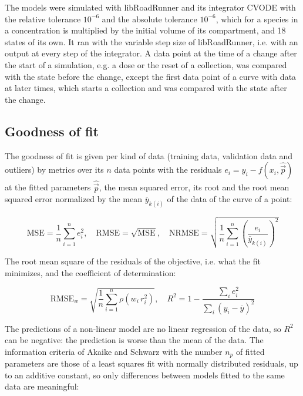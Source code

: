 The models were simulated with libRoadRunner \cite{Welsh2023} and its integrator CVODE \cite{Hindmarsh2005} with the relative tolerance $10^{-6}$ and the absolute tolerance $10^{-6}$, which for a species in a concentration is multiplied by the initial volume of its compartment, and 18 states of its own. It ran with the variable step size of libRoadRunner, i.e. with an output at every step of the integrator. A data point at the time of a change after the start of a simulation, e.g. a dose or the reset of a collection, was compared with the state before the change, except the first data point of a curve with data at later times, which starts a collection and was compared with the state after the change.

\subsection{Goodness of fit}

The goodness of fit is given per kind of data (training data, validation data and outliers) by metrics over its $n$ data points with the residuals $e_i = y_i - f(x_i, \hat{\vec{p}})$ at the fitted parameters $\hat{\vec{p}}$, the mean squared error, its root and the root mean squared error normalized by the mean $\overline{y}_{k(i)}$ of the data of the curve of a point:

\begin{equation}
\mathrm{MSE} = \frac{1}{n} \sum_{i=1}^{n} e_i^2, \quad \mathrm{RMSE} = \sqrt{\mathrm{MSE}}, \quad \mathrm{NRMSE} = \sqrt{\frac{1}{n} \sum_{i=1}^{n} \left(\frac{e_i}{\overline{y}_{k(i)}}\right)^2}
\end{equation}

The root mean square of the residuals of the objective, i.e. what the fit minimizes, and the coefficient of determination:

\begin{equation}
\mathrm{RMSE}_w = \sqrt{\frac{1}{n} \sum_{i=1}^{n} \rho\left(w_i\, r_i^2\right)}, \quad R^2 = 1 - \frac{\sum_{i} e_i^2}{\sum_{i} \left(y_i - \overline{y}\right)^2}
\end{equation}

The predictions of a non-linear model are no linear regression of the data, so $R^2$ can be negative: the prediction is worse than the mean of the data. The information criteria of Akaike \cite{Akaike1974} and Schwarz \cite{Schwarz1978} with the number $n_p$ of fitted parameters are those of a least squares fit with normally distributed residuals, up to an additive constant, so only differences between models fitted to the same data are meaningful:

